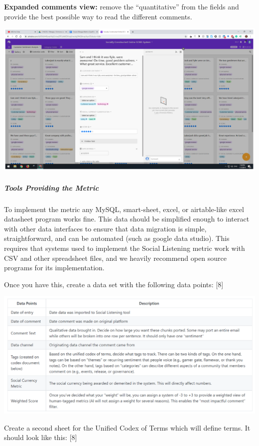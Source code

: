 \textbf{Expanded comments view:} remove the ``quantitative'' from the
fields and provide the best possible way to read the different comments.

\includegraphics{images/social-listening_expanded-comment.png}

\hypertarget{tools-providing-the-metric}{%
\subparagraph{Tools Providing the
Metric}\label{tools-providing-the-metric}}

To implement the metric any MySQL, smart-sheet, excel, or airtable-like
excel datasheet program works fine. This data should be simplified
enough to interact with other data interfaces to ensure that data
migration is simple, straightforward, and can be automated (such as
google data studio). This requires that systems used to implement the
Social Listening metric work with CSV and other spreadsheet files, and
we heavily recommend open source programs for its implementation.

Once you have this, create a data set with the following data points:
{[}8{]}

\includegraphics{images/social-listening_data-points-table.png}

Create a second sheet for the Unified Codex of Terms which will define
terms. It should look like this: {[}8{]}

